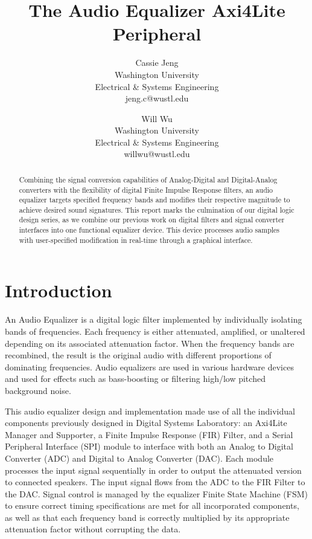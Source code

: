 \documentclass[journal]{IEEEtran} %
\begin{document}
\title{The Audio Equalizer Axi4Lite Peripheral}

\author{
\setlength{\tabcolsep}{50pt}
\begin{tabular}{c} Cassie Jeng \\ Washington University \\ Electrical \& Systems Engineering\\ jeng.c@wustl.edu \end{tabular} \and
\begin{tabular}{c} Will Wu \\ Washington University \\ Electrical \& Systems Engineering\\ willwu@wustl.edu \end{tabular}  }

\maketitle

\begin{abstract}
    Combining the signal conversion capabilities of Analog-Digital and Digital-Analog converters with the flexibility of digital Finite Impulse Response filters, an audio equalizer targets specified frequency bands and modifies their respective magnitude to achieve desired sound signatures. This report marks the culmination of our digital logic design series, as we combine our previous work on digital filters and signal converter interfaces into one functional equalizer device. This device processes audio samples with user-specified modification in real-time through a graphical interface.
\end{abstract}
\section{Introduction} \label{sec:intro}
An Audio Equalizer is a digital logic filter implemented by individually isolating bands of frequencies. Each frequency is either attenuated, amplified, or unaltered depending on its associated attenuation factor. When the frequency bands are recombined, the result is the original audio with different proportions of dominating frequencies. Audio equalizers are used in various hardware devices and used for effects such as bass-boosting or filtering high/low pitched background noise.

This audio equalizer design and implementation made use of all the individual components previously designed in Digital Systems Laboratory: an Axi4Lite Manager and Supporter, a Finite Impulse Response (FIR) Filter, and a Serial Peripheral Interface (SPI) module to interface with both an Analog to Digital Converter (ADC) and Digital to Analog Converter (DAC). Each module processes the input signal sequentially in order to output the attenuated version to connected speakers. The input signal flows from the ADC to the FIR Filter to the DAC. Signal control is managed by the equalizer Finite State Machine (FSM) to ensure correct timing specifications are met for all incorporated components, as well as that each frequency band is correctly multiplied by its appropriate attenuation factor without corrupting the data.
\end{document}
